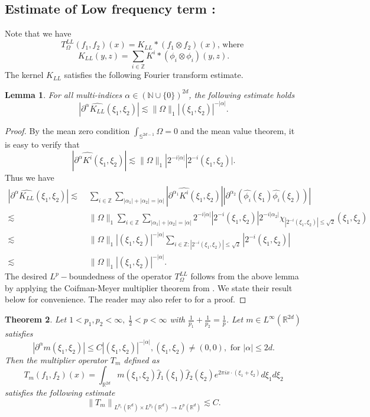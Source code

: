 \documentclass[a4paper,reqno]{amsart}
\newcommand{\N}{{\mathbb N}}
\newcommand{\Z}{{\mathbb Z}}
\newtheorem{theorem}{Theorem}[section]
\newtheorem{lemma}[theorem]{Lemma}
\theoremstyle{definition}
\numberwithin{equation}{section}
\begin{document}
\subsection*{Estimate of Low frequency term :} Note that we have 
\[T_{\Omega}^{LL}\left(f_1, f_2\right)(x)=K_{LL} *(f_1 \otimes f_2)(x) \text {, where }\]
\[K_{LL}(y, z)=\sum_{i \in \mathbb{Z}} K^i *\left(\phi_i \otimes \phi_i\right)(y, z).\]
The kernel $K_{LL}$ satisfies the following Fourier transform estimate.
\begin{lemma}For all multi-indices $\alpha\in(\N\cup\{0\})^{2d}$, the following estimate holds
	\[|\partial^\alpha\widehat{K_{LL}}(\xi_1,\xi_2)|\lesssim\|\Omega\|_1|(\xi_1,\xi_2)|^{-|\alpha|}.\]
\end{lemma}
\begin{proof}
By the mean zero condition $\int_{\mathbb S^{2d-1}}\Omega=0$ and the mean value theorem, it is easy to verify that \[|\partial^\alpha\widehat{K^i}(\xi_1,\xi_2)|\lesssim\|\Omega\|_1|2^{-i|\alpha|}|2^{-i}(\xi_1,\xi_2)|.\] 
Thus we have
\begin{align*}
	|\partial^\alpha\widehat{K_{LL}}(\xi_1,\xi_2)|\lesssim&\;\sum_{i\in\Z}\sum_{|\alpha_1|+|\alpha_2|=|\alpha|}|\partial^{\alpha_1}\widehat{K^i}(\xi_1,\xi_2)||\partial^{\alpha_2}(\widehat{\phi_i}(\xi_1) \widehat{\phi_i}(\xi_2))|\\
	\lesssim&\;\|\Omega\|_1\sum_{i\in\Z}\sum_{|\alpha_1|+|\alpha_2|=|\alpha|}2^{-i|\alpha|}|2^{-i}(\xi_1,\xi_2)|2^{-i|\alpha_2|}\chi_{|2^{-i}(\xi_1,\xi_2)|\leq\sqrt{2}}(\xi_1,\xi_2)\\
	\lesssim&\;\|\Omega\|_1|(\xi_1,\xi_2)|^{-|\alpha|}\sum_{i\in\Z:|2^{-i}(\xi_1,\xi_2)|\leq\sqrt{2}}|2^{-i}(\xi_1,\xi_2)|\\
	\lesssim&\;\|\Omega\|_1|(\xi_1,\xi_2)|^{-|\alpha|}.
\end{align*}
The desired $L^p-$boundedness of the operator $T_{\Omega}^{LL}$ follows from the above lemma by applying the Coifman-Meyer multiplier theorem from \cite{CM1978}. We state their result below for convenience. The reader may also refer to \cite[Theorem 7.5.3]{GrafakosmodernFA} for a proof. 
\end{proof}
\begin{theorem}{\cite{CM1978}}
	Let $1<p_1, p_2<\infty,\;\frac{1}{2}< p<\infty$ with $\frac{1}{p_1}+\frac{1}{p_2}=\frac{1}{p}$. Let $m \in L^{\infty}\left(\mathbb{R}^{2 d}\right)$ satisfies
	\[\left|\partial^\alpha m\left(\xi_1, \xi_2\right)\right|\leq C\left|\left(\xi_1, \xi_2\right)\right|^{-|\alpha|},\left(\xi_1, \xi_2\right) \neq(0,0), \text { for }|\alpha| \leq 2 d.\]
	Then the multiplier operator $T_m$ defined as
	\[T_m\left(f_1, f_2\right)(x)=\int_{\mathbb{R}^{2 d}} m\left(\xi_1, \xi_2\right) \widehat{f}_1\left(\xi_1\right) \widehat{f}_2\left(\xi_2\right) e^{2 \pi i x \cdot\left(\xi_1+\xi_2\right)} d \xi_1 d \xi_2\]
	satisfies the following estimate
	\[\left\|T_m\right\|_{L^{p_1}\left(\mathbb{R}^d\right) \times L^{p_2}\left(\mathbb{R}^d\right) \rightarrow L^p\left(\mathbb{R}^d\right)} \lesssim C.\]
\end{theorem}
\end{document}
